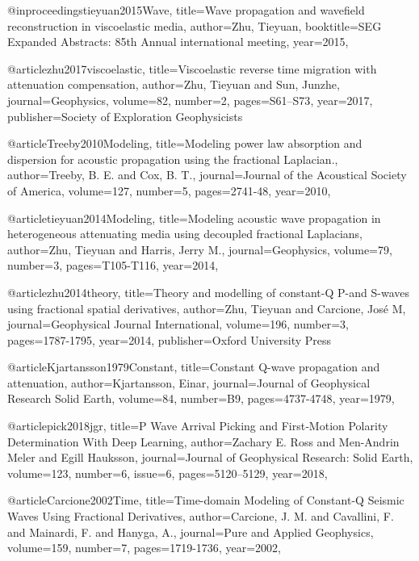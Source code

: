 @inproceedings{tieyuan2015Wave,
  title={Wave propagation and wavefield reconstruction in viscoelastic media},
  author={Zhu, Tieyuan},
  booktitle={SEG Expanded Abstracts: 85th Annual international meeting},
  year={2015},
}

@article{zhu2017viscoelastic,
  title={Viscoelastic reverse time migration with attenuation compensation},
  author={Zhu, Tieyuan and Sun, Junzhe},
  journal={Geophysics},
  volume={82},
  number={2},
  pages={S61--S73},
  year={2017},
  publisher={Society of Exploration Geophysicists}
}


@article{Treeby2010Modeling,
  title={Modeling power law absorption and dispersion for acoustic propagation using the fractional Laplacian.},
  author={Treeby, B. E. and Cox, B. T.},
  journal={Journal of the Acoustical Society of America},
  volume={127},
  number={5},
  pages={2741-48},
  year={2010},
}

@article{tieyuan2014Modeling,
  title={Modeling acoustic wave propagation in heterogeneous attenuating media using decoupled fractional Laplacians},
  author={Zhu, Tieyuan and Harris, Jerry M.},
  journal={Geophysics},
  volume={79},
  number={3},
  pages={T105-T116},
  year={2014},
}

@article{zhu2014theory,
  title={Theory and modelling of constant-{Q} {P}-and {S}-waves using fractional spatial derivatives},
  author={Zhu, Tieyuan and Carcione, Jos{\'e} M},
  journal={Geophysical Journal International},
  volume={196},
  number={3},
  pages={1787-1795},
  year={2014},
  publisher={Oxford University Press}
}


@article{Kjartansson1979Constant,
  title={Constant {Q}-wave propagation and attenuation},
  author={Kjartansson, Einar},
  journal={Journal of Geophysical Research Solid Earth},
  volume={84},
  number={B9},
  pages={4737-4748},
  year={1979},
}

@article{pick2018jgr,
  title={P Wave Arrival Picking and First‐Motion Polarity Determination With Deep Learning},
  author={Zachary E. Ross and Men-Andrin Meler and Egill Hauksson},
  journal={Journal of Geophysical Research: Solid Earth},
  volume={123},
  number={6},
  issue=6,
  pages={5120–5129},
  year={2018},
}

@article{Carcione2002Time,
  title={Time-domain Modeling of Constant-{Q} Seismic Waves Using Fractional Derivatives},
  author={Carcione, J. M. and Cavallini, F. and Mainardi, F. and Hanyga, A.},
  journal={Pure and Applied Geophysics},
  volume={159},
  number={7},
  pages={1719-1736},
  year={2002},
}

